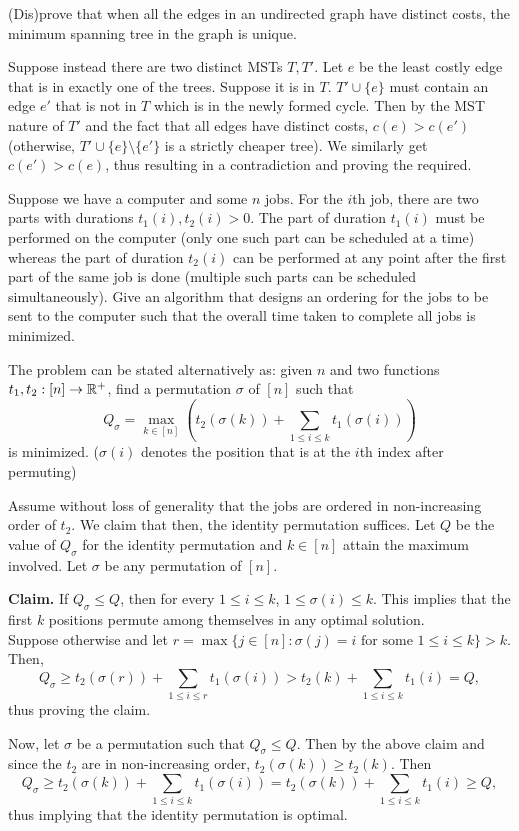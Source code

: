 	\begin{exercise}
		(Dis)prove that when all the edges in an undirected graph have distinct costs, the minimum spanning tree in the graph is unique.
	\end{exercise}
	\begin{solution*}
		Suppose instead there are two distinct MSTs $T, T'$. Let $e$ be the least costly edge that is in exactly one of the trees. Suppose it is in $T$. $T'\cup\{e\}$ must contain an edge $e'$ that is not in $T$ which is in the newly formed cycle. Then by the MST nature of $T'$ and the fact that all edges have distinct costs, $c(e)>c(e')$ (otherwise, $T'\cup\{e\}\setminus\{e'\}$ is a strictly cheaper tree). We similarly get $c(e')>c(e)$, thus resulting in a contradiction and proving the required.
	\end{solution*}

	\begin{exercise}
		Suppose we have a computer and some $n$ jobs. For the $i$th job, there are two parts with durations $t_{1}(i),t_{2}(i)>0$. The part of duration $t_{1}(i)$ must be performed on the computer (only one such part can be scheduled at a time) whereas the part of duration $t_{2}(i)$ can be performed at any point after the first part of the same job is done (multiple such parts can be scheduled simultaneously). Give an algorithm that designs an ordering for the jobs to be sent to the computer such that the overall time taken to complete all jobs is minimized.
	\end{exercise}
	\begin{solution*}
		The problem can be stated alternatively as: given $n$ and two functions $t_1,t_2:[n]\to\mathbb{R}^+$, find a permutation $\sigma$ of $[n]$ such that
		\[ Q_\sigma = \max_{k\in[n]} \left(t_2(\sigma(k)) + \sum_{1\leq i\leq k} t_1(\sigma(i))\right) \]
		is minimized. ($\sigma(i)$ denotes the position that is at the $i$th index after permuting)

		Assume without loss of generality that the jobs are ordered in non-increasing order of $t_2$. We claim that then, the identity permutation suffices. Let $Q$ be the value of $Q_\sigma$ for the identity permutation and $k\in[n]$ attain the maximum involved. Let $\sigma$ be any permutation of $[n]$.

		\textbf{Claim.} If $Q_\sigma\leq Q$, then for every $1\leq i\leq k$, $1\leq\sigma(i)\leq k$. This implies that the first $k$ positions permute among themselves in any optimal solution.\\
		Suppose otherwise and let $r=\max\{j\in[n] : \sigma(j)=i\text{ for some }1\leq i\leq k\}> k$. Then,
		\[ Q_\sigma \geq t_2(\sigma(r)) + \sum_{1\leq i\leq r} t_1(\sigma(i)) > t_2(k) + \sum_{1\leq i\leq k}t_1(i) = Q, \]
		thus proving the claim.

		Now, let $\sigma$ be a permutation such that $Q_\sigma \leq Q$. Then by the above claim and since the $t_2$ are in non-increasing order, $t_2(\sigma(k))\geq t_2(k)$. Then
		\[ Q_\sigma \geq t_2(\sigma(k)) + \sum_{1\leq i\leq k} t_1(\sigma(i)) = t_2(\sigma(k)) + \sum_{1\leq i\leq k} t_1(i) \geq Q, \]
		thus implying that the identity permutation is optimal. 
	\end{solution*}


